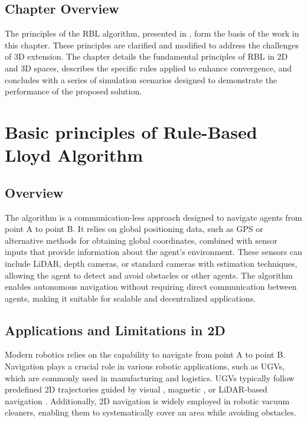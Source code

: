     \subsection{Chapter Overview}
        The principles of the \ac{RBL} algorithm, presented in \cite{rbl_paper}, form the basis of the work in this chapter. 
        These principles are clarified and modified to address the challenges of 3D extension.  
        The chapter details the fundamental principles of RBL in 2D and 3D spaces, describes the specific rules applied to enhance convergence, and concludes with a series of simulation scenarios designed to demonstrate the performance of the proposed solution.

\section{Basic principles of Rule-Based Lloyd Algorithm}

    \subsection{Overview}        
        The algorithm is a communication-less approach designed to navigate agents from point A to point B. 
        It relies on global positioning data, such as GPS or alternative methods for obtaining global coordinates, combined with sensor inputs that provide information about the agent's environment. 
        These sensors can include LiDAR, depth cameras, or standard cameras with estimation techniques, allowing the agent to detect and avoid obstacles or other agents. 
        The algorithm enables autonomous navigation without requiring direct communication between agents, making it suitable for scalable and decentralized applications.

    \subsection{Applications and Limitations in 2D}
        Modern robotics relies on the capability to navigate from point A to point B.
        Navigation plays a crucial role in various robotic applications, such as \ac{UGV}s, which are commonly used in manufacturing and logistics. 
        \ac{UGV}s typically follow predefined 2D trajectories guided by visual \cite{vision_navigation}, magnetic \cite{magnetic_navigation}, or LiDAR-based navigation \cite{lidar_navigation}. 
        Additionally, 2D navigation is widely employed in robotic vacuum cleaners, enabling them to systematically cover an area while avoiding obstacles.

